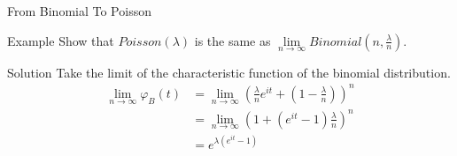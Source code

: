 \documentclass{beamer}
\begin{document}
\begin{frame}{From Binomial To Poisson}
\begin{block}{Example}
	Show that $Poisson(\lambda)$ is the same as $\lim\limits_{n\to\infty}Binomial(n,\frac{\lambda}{n})$.
\end{block}\pause
\begin{exampleblock}{Solution}
	Take the limit of the characteristic function of the binomial distribution.
	$$\begin{aligned}
	\lim\limits_{n\to\infty}\varphi_B(t)&
	=\lim\limits_{n\to\infty}(\frac{\lambda}{n}e^{it}+(1-\frac{\lambda}{n}))^n\\
	&=\lim\limits_{n\to\infty}(1+(e^{it}-1)\frac{\lambda}{n})^n\\
	&=e^{\lambda(e^{it}-1)}
	\end{aligned}$$
\end{exampleblock}
\end{frame}
\end{document}
